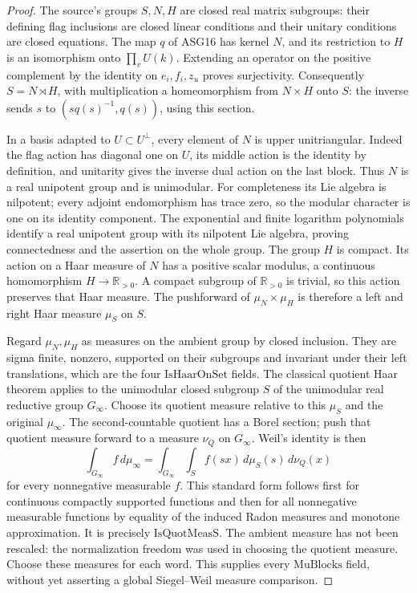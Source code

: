 \documentclass[11pt,a4paper]{article}
\numberwithin{equation}{section}
\theoremstyle{remark}\newtheorem{remark}[theorem]{Remark}
\begin{document}
\begin{proof}
The source's groups \(S,N,H\) are closed real matrix subgroups:
their defining flag inclusions are closed linear conditions and their
unitary conditions are closed equations.  The map \(q\) of ASG16
has kernel \(N\), and its restriction to \(H\) is an isomorphism
onto \(\prod_v U(k)\).  Extending an operator on the positive
complement by the identity on \(e_i,f_i,z_u\) proves surjectivity.
Consequently \(S=N\rtimes H\), with multiplication a homeomorphism
from \(N\times H\) onto \(S\): the inverse sends \(s\) to
\((s q(s)^{-1},q(s))\), using this section.

In a basis adapted to \(U\subset U^\perp\), every element of
\(N\) is upper unitriangular.  Indeed the flag action has diagonal
one on \(U\), its middle action is the identity by definition,
and unitarity gives the inverse dual action on the last block.
Thus \(N\) is a real unipotent group and is unimodular.
For completeness its Lie algebra is nilpotent; every adjoint
endomorphism has trace zero, so the modular character is one on its
identity component.  The exponential and finite logarithm polynomials
identify a real unipotent group with its nilpotent Lie algebra, proving
connectedness and the assertion on the whole group.
The group \(H\) is compact.  Its action on a Haar measure of \(N\)
has a positive scalar modulus, a continuous homomorphism
\(H\to\mathbb R_{>0}\).  A compact subgroup of
\(\mathbb R_{>0}\) is trivial, so this action preserves that Haar
measure.  The pushforward of \(\mu_N\times\mu_H\) is therefore
a left and right Haar measure \(\mu_S\) on \(S\).

Regard \(\mu_N,\mu_H\) as measures on the ambient group by
closed inclusion.  They are sigma finite, nonzero, supported on their
subgroups and invariant under their left translations, which are the
four \(\mathrm{IsHaarOnSet}\) fields.
The classical quotient Haar theorem applies to the unimodular closed
subgroup \(S\) of the unimodular real reductive group \(G_\infty\).
Choose its quotient measure relative to this \(\mu_S\) and the
original \(\mu_\infty\).  The second-countable quotient has a
Borel section; push that quotient measure forward to a measure
\(\nu_Q\) on \(G_\infty\).  Weil's identity is then
\[
 \int_{G_\infty} f\,d\mu_\infty
       =\int_{G_\infty}\int_S f(sx)\,d\mu_S(s)\,d\nu_Q(x)
\tag{ASG.14}
\]
for every nonnegative measurable \(f\).  This standard form follows
first for continuous compactly supported functions and then for all
nonnegative measurable functions by equality of the induced Radon
measures and monotone approximation.  It is precisely
\(\mathrm{IsQuotMeasS}\).  The ambient measure has not been
rescaled: the normalization freedom was used in choosing the quotient
measure.  Choose these measures for each word.  This supplies every
\(\mathrm{MuBlocks}\) field, without yet asserting a global
Siegel--Weil measure comparison.
\end{proof}
\end{document}
